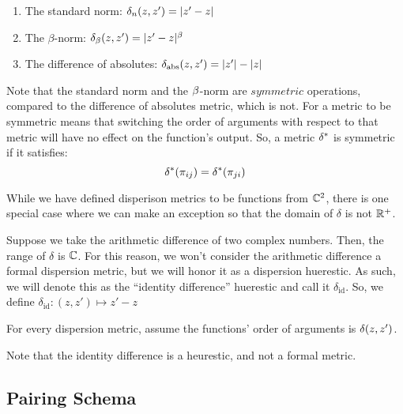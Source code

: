 \begin{enumerate}
\item The standard norm: $\delta_{n}(z,z') = |z' - z|$
\item The $\beta$-norm: $\delta_\beta(z,z') = |z' - z|^\beta$
\item The difference of absolutes: $\delta_{\text{abs}}(z,z') = |z'| - |z|$
\end{enumerate}

\begin{remark}
Note that the standard norm and the $\beta$-norm are $\textit{symmetric}$ operations, compared to the difference of absolutes metric, which is not.
For a metric to be symmetric means that switching the order of arguments with respect to that metric will have no effect on the function's output.
So, a metric $\delta^*$ is symmetric if it satisfies:
$$\delta^*({\pi_{ij}}) = \delta^*(\pi_{ji})$$
\end{remark}

While we have defined disperison metrics to be functions from $\mathbb{C}^2$, there is one special case where we can make an exception so that the domain of $\delta$ is not $\mathbb{R}^+$.

\begin{remark}
Suppose we take the arithmetic difference of two complex numbers. Then, the range of $\delta$ is $\mathbb{C}$.
For this reason, we won't consider the arithmetic difference a formal dispersion metric, but we will honor it as a dispersion huerestic.
As such, we will denote this as the ``identity difference'' huerestic and call it $\delta_{\text{id}}$. So, we define $\delta_{\text{id}}: (z, z') \mapsto z' - z$
\end{remark}

For every dispersion metric, assume the functions' order of arguments is $\delta(z, z')$. \newline
\begin{center}
\dispersiontable %
\end{center}
\vspace{1em}

\noindent *Note that the identity difference is a heurestic, and not a formal metric.

\subsection{Pairing Schema}


